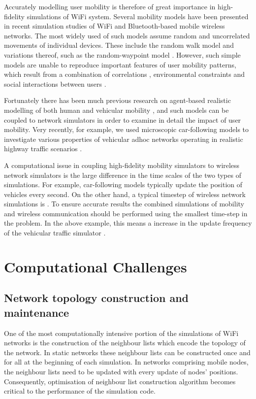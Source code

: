 \documentclass{elsart}
\begin{document}
Accurately modelling  user mobility is therefore of great importance in 
high-fidelity simulations of WiFi system. Several 
mobility models have been presented in recent simulation
studies of WiFi and Bluetooth-based mobile wireless networks. The most 
widely used of such models assume random and uncorrelated 
movements of individual devices. These include the random walk model 
and variations thereof, such as the random-waypoint model \cite{camp}.
However, such simple models are unable to reproduce important 
features of user mobility patterns, which result from a 
combination of  correlations \cite{helbig}, environmental constraints
\cite{helbig} and social interactions between users \cite{mascolo}.

Fortunately there has been much 
previous research on agent-based realistic modelling of both human and 
vehicular mobility \cite{helbig,ball}, and such models  
can be coupled to network simulators in order 
to examine in detail the impact of user mobility.
Very recently, for example, we used 
microscopic car-following models to investigate various properties 
of vehicular adhoc networks operating in realistic highway traffic scenarios \cite{maziar-vanet}.

A computational issue in coupling high-fidelity 
mobility simulators to wireless network simulators is the 
large difference in the time scales of the two types of simulations.
For example, car-following models typically 
update the position of vehicles every second. On the other hand, a typical 
timestep of wireless network simulations is  .
To ensure accurate results the combined simulations of 
mobility and wireless communication should be performed using the smallest
time-step in the problem. In the above example, this means a 
 increase in the update frequency of the vehicular traffic simulator
\cite{vanet}.

 
\section{Computational Challenges}

\subsection{Network topology construction and maintenance}
One of the most computationally intensive portion of 
the simulations of WiFi networks is 
the construction of the neighbour lists which encode the topology 
of the network.
In static networks these neighbour lists can be constructed once and for all 
at the beginning of each simulation. In networks comprising  
mobile nodes, the neighbour lists need to be updated with 
every update of  nodes' positions. Consequently,
optimisation of neighbour list construction algorithm 
becomes critical to the performance of the simulation code.
\end{document}
